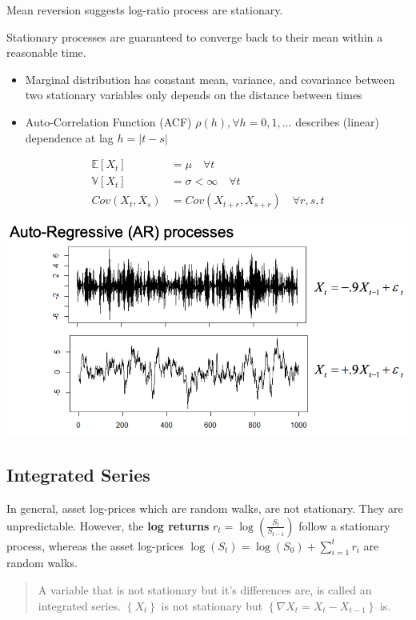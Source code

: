 \documentclass[
  oneside]{book}
\providecommand{\tightlist}{%
  \setlength{\itemsep}{0pt}\setlength{\parskip}{0pt}}
\begin{document}
Mean reversion suggests log-ratio process are stationary.

Stationary processes are guaranteed to converge back to their mean within a reasonable time.

\begin{itemize}
\tightlist
\item
  Marginal distribution has constant mean, variance, and covariance between two stationary variables only depends on the distance between times
\item
  Auto-Correlation Function (ACF) \(\rho(h), \forall h=0,1, \ldots\) describes (linear) dependence at lag \(h=|t-s|\)
\end{itemize}

\[
\begin{aligned}
\mathbb{E}[X_{t}] &= \mu  \quad \forall t\\
\mathbb{V}[X_{t}] &= \sigma < \infty \quad \forall t\\
Cov(X_{t},X_{s}) &= Cov(X_{t+r},X_{s+r}) \quad \forall r,s,t
\end{aligned}
\]

\includegraphics{Notes/Obsidian-Attachments/9-Statistical-Arbitrage-6.png}

\hypertarget{integrated-series}{%
\subsection{Integrated Series}\label{integrated-series}}

In general, asset log-prices which are random walks, are not stationary. They are unpredictable. However, the \textbf{log returns} \(r_{t} = \log(\frac{S_{t}}{S_{t-1}})\) follow a stationary process, whereas the asset log-prices \(\log(S_{t}) = \log(S_{0}) + \sum^{t}_{i=1}r_i\) are random walks.

\begin{quote}
A variable that is not stationary but it's differences are, is called an integrated series. \(\left\{ X_{t} \right\}\) is not stationary but \(\left\{ \nabla X_{t} = X_{t} - X_{t-1}\right\}\) is.
\end{quote}
\end{document}
